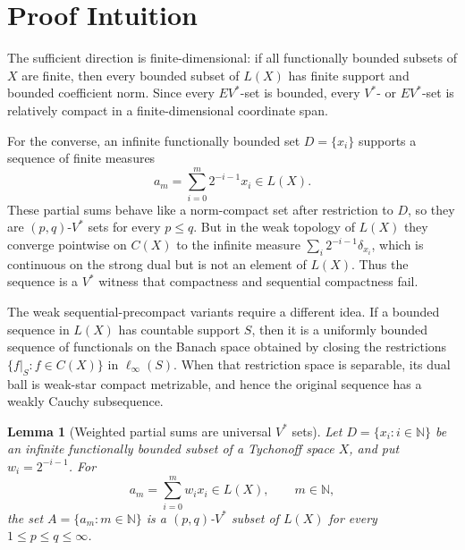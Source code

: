 \documentclass[11pt]{article}
\newtheorem{lemma}{Lemma}
\newcommand{\N}{\mathbb N}
\newcommand{\Vstar}{V^\ast}
\newcommand{\EVstar}{EV^\ast}
\begin{document}
\section*{Proof Intuition}

The sufficient direction is finite-dimensional: if all functionally
bounded subsets of \(X\) are finite, then every bounded subset of \(L(X)\)
has finite support and bounded coefficient norm. Since every
\(\EVstar\)-set is bounded, every \(\Vstar\)- or \(\EVstar\)-set is
relatively compact in a finite-dimensional coordinate span.

For the converse, an infinite functionally bounded set \(D=\{x_i\}\)
supports a sequence of finite measures
\[
  a_m=\sum_{i=0}^{m}2^{-i-1}x_i\in L(X).
\]
These partial sums behave like a norm-compact set after restriction to
\(D\), so they are \((p,q)\)-\(\Vstar\) sets for every \(p\le q\). But in
the weak topology of \(L(X)\) they converge pointwise on \(C(X)\) to the
infinite measure \(\sum_i2^{-i-1}\delta_{x_i}\), which is continuous on
the strong dual but is not an element of \(L(X)\). Thus the sequence is a
\(\Vstar\) witness that compactness and sequential compactness fail.

The weak sequential-precompact variants require a different idea. If a
bounded sequence in \(L(X)\) has countable support \(S\), then it is a
uniformly bounded sequence of functionals on the Banach space obtained by
closing the restrictions \(\{f|_S:f\in C(X)\}\) in \(\ell_\infty(S)\).
When that restriction space is separable, its dual ball is weak-star
compact metrizable, and hence the original sequence has a weakly Cauchy
subsequence.

\begin{lemma}[Weighted partial sums are universal \(\Vstar\) sets]
\label{lem:weighted-vstar}
Let \(D=\{x_i:i\in\N\}\) be an infinite functionally bounded subset of a
Tychonoff space \(X\), and put \(w_i=2^{-i-1}\). For
\[
  a_m=\sum_{i=0}^{m} w_i x_i\in L(X),\qquad m\in\N,
\]
the set \(A=\{a_m:m\in\N\}\) is a \((p,q)\)-\(\Vstar\) subset of \(L(X)\)
for every \(1\le p\le q\le\infty\).
\end{lemma}
\end{document}
